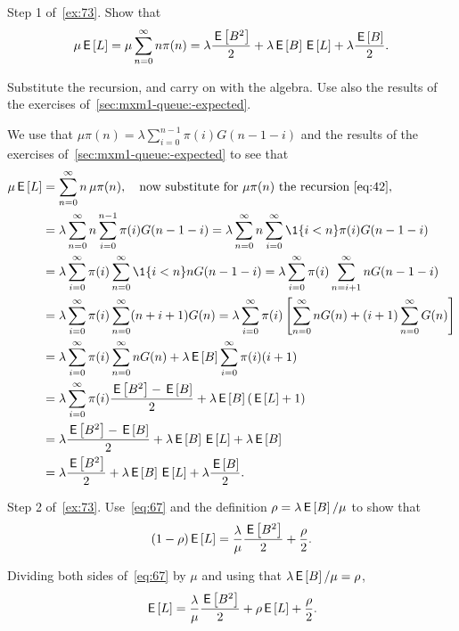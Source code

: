 \begin{extra}\label{ex:71}
  Step 1 of~\cref{ex:73}.
  Show that
\begin{equation}\label{eq:67}
  \mu \,\mathsf{E}\left[L\right] =\mu \sum_{n=0}^\infty n \pi(n) = \lambda \frac{\,\mathsf{E}\left[B^2\right]}2  + \lambda \,\mathsf{E}\left[B\right] \,\mathsf{E}\left[L\right] +\lambda \frac{\,\mathsf{E}\left[B\right]}2.
\end{equation}
\begin{hint}
  Substitute the recursion, and carry on with the algebra.
  Use also the results of the exercises of~\cref{sec:mxm1-queue:-expected}.
\end{hint}
\begin{solution}
  We use that $\mu \pi(n) =\lambda \sum_{i=0}^{n-1} \pi(i) G(n-1-i)$ and the results of the exercises of~\cref{sec:mxm1-queue:-expected} to see that
\begin{align*}
  \mu \E L
  &=\sum_{n=0}^\infty n\, \mu \pi(n), \quad \text{now substitute for $\mu \pi(n)$ the recursion~\cref{eq:42}}, \\
& =\lambda \sum_{n=0}^\infty n \sum_{i=0}^{n-1} \pi(i) G(n-1-i) 
  =\lambda \sum_{n=0}^\infty n \sum_{i=0}^\infty \1{i<n} \pi(i) G(n-1-i) \\
& =\lambda \sum_{i=0}^\infty \pi(i) \sum_{n=0}^\infty \1{i<n} n G(n-1-i) 
  =\lambda \sum_{i=0}^\infty \pi(i) \sum_{n=i+1}^\infty n G(n-1-i) \\
& =\lambda \sum_{i=0}^\infty \pi(i) \sum_{n=0}^\infty (n+i+1) G(n) 
  =\lambda \sum_{i=0}^\infty \pi(i) \left[\sum_{n=0}^\infty n G(n) +(i+1) \sum_{n=0}^\infty G(n)\right]  \\
  &=\lambda \sum_{i=0}^\infty \pi(i)\sum_{n=0}^\infty n G(n) +\lambda  \E B \sum_{i=0}^\infty \pi(i) (i+1)  \\ 
  &=\lambda \sum_{i=0}^\infty \pi(i) \frac{\E{B^2} -\E B}2  + \lambda \E B (\E L +1)  \\ 
  &= \lambda \frac{\E{B^2} -\E B}2  + \lambda \E B \E L +\lambda \E B \\
  &= \lambda \frac{\E{B^2} }2  + \lambda \E B \E L +\lambda \frac{\E B}2.
\end{align*}
\end{solution}
\end{extra}

\begin{extra}\label{ex:72}
  Step 2 of~\cref{ex:73}.
  Use~\cref{eq:67} and the definition $\rho=\lambda \,\mathsf{E}\left[B\right]/\mu$ to show that
\begin{equation*}
(1- \rho) \,\mathsf{E}\left[L\right] = \frac{\lambda}\mu \frac{\,\mathsf{E}\left[B^2\right]}2 + \frac\rho2.
\end{equation*}
\begin{solution}
  Dividing both sides of~\cref{eq:67} by $\mu$ and using that $\lambda \,\mathsf{E}\left[B\right]/\mu = \rho$,
\begin{equation*}
  \,\mathsf{E}\left[L\right] = \frac{\lambda}{\mu}  \frac{\,\mathsf{E}\left[B^2\right]}2 + \rho \,\mathsf{E}\left[L\right] + \frac\rho2.
\end{equation*}
\end{solution}
\end{extra}



